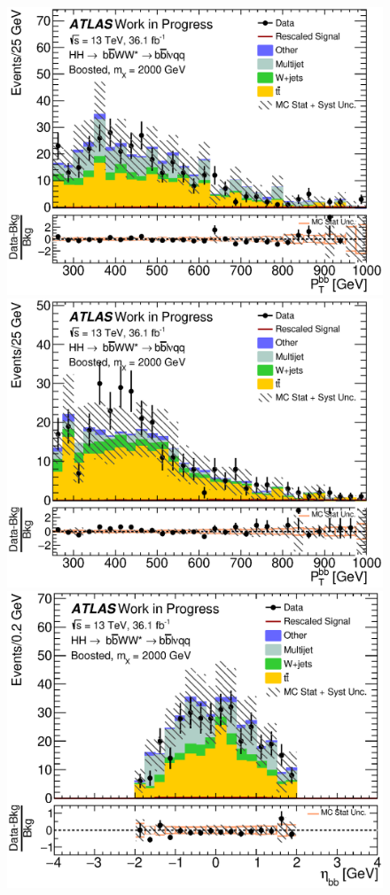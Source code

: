 \begin{figure}[h]
\begin{center}
\includegraphics[scale=0.33]{figures/kinplots/C_2tag_mbbcr_elec_presel_met50_HbbPt}
\includegraphics[scale=0.33]{figures/kinplots/C_2tag_mbbcr_muon_presel_met50_HbbPt}\\
\includegraphics[scale=0.33]{figures/kinplots/C_2tag_mbbcr_elec_presel_met50_HbbEta}

\end{center}
\end{figure}
